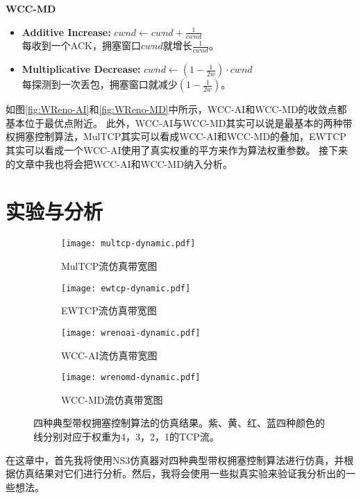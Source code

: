 \documentclass[winfonts]{njuthesis}
\begin{document}
\textbf{\large WCC-MD}
\begin{itemize}
  \item {\bf Additive Increase:} $cwnd \leftarrow cwnd + \frac{1}{cwnd}$ \\
  每收到一个ACK，拥塞窗口$cwnd$就增长$\frac{1}{cwnd}$。
  \item {\bf Multiplicative Decrease:} $cwnd \leftarrow ( 1 - \frac{1}{2w}) \cdot cwnd$ \\
  每探测到一次丢包，拥塞窗口就减少$\left( 1 - \frac{1}{2w} \right)$。
\end{itemize}

如图\ref{fig:WReno-AI}和\ref{fig:WReno-MD}中所示，WCC-AI和WCC-MD的收敛点都基本位于最优点附近。
此外，WCC-AI与WCC-MD其实可以说是最基本的两种带权拥塞控制算法，MulTCP其实可以看成WCC-AI和WCC-MD的叠加，EWTCP其实可以看成一个WCC-AI使用了真实权重的平方来作为算法权重参数。
接下来的文章中我也将会把WCC-AI和WCC-MD纳入分析。

\chapter{实验与分析}\label{chapter:analysis}

\begin{figure*}[tp]
	\centering
  \begin{subfigure}{.6\textwidth}
    \centering
		\texttt{[image: multcp-dynamic.pdf]}
    \caption{MulTCP流仿真带宽图}
    \label{fig:MulTCPPerformance}
  \end{subfigure}
  \begin{subfigure}{.6\textwidth}
    \centering
		\texttt{[image: ewtcp-dynamic.pdf]}
    \caption{EWTCP流仿真带宽图}
    \label{fig:EWTCPPerformance}
	\end{subfigure}
  \begin{subfigure}{.6\textwidth}
    \centering
		\texttt{[image: wrenoai-dynamic.pdf]}
    \caption{WCC-AI流仿真带宽图}
    \label{fig:WReno-AIPerformance}
  \end{subfigure}
  \begin{subfigure}{.6\textwidth}
    \centering
		\texttt{[image: wrenomd-dynamic.pdf]}
    \caption{WCC-MD流仿真带宽图}
    \label{fig:WReno-MDPerformance}
	\end{subfigure}
	\caption{四种典型带权拥塞控制算法的仿真结果。紫、黄、红、蓝四种颜色的线分别对应于权重为4，3，2，1的TCP流。}
	\label{fig:Performance}
\end{figure*}


在这章中，首先我将使用NS3仿真器\cite{NS3}对四种典型带权拥塞控制算法进行仿真，并根据仿真结果对它们进行分析。然后，我将会使用一些拟真实验来验证我分析出的一些想法。
\end{document}
